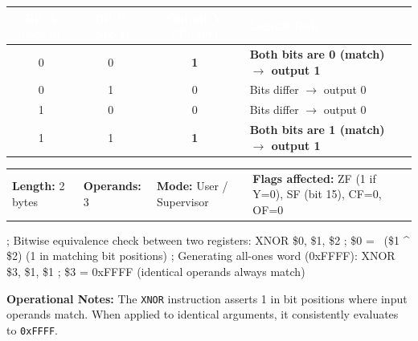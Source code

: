 \documentclass[11pt,a4paper]{article}
\newcommand{\reg}{\$}
\renewcommand{\arraystretch}{1.25}
\begin{document}
\vspace{0.5mm}
\par\vspace{0.8mm}
\noindent
{\footnotesize\renewcommand{\arraystretch}{1.1}%
\begin{tabularx}{\textwidth}{@{} c c c X @{}}
\toprule
\rowcolor{limslate}
\textcolor{white}{\textbf{Bit A (Src 0)}} & \textcolor{white}{\textbf{Bit B (Src 1)}} & \textcolor{white}{\textbf{Output Y (Target)}} & \textcolor{white}{\textbf{Logical Rule}} \\
\midrule
\rowcolor{limorangelight}
0 & 0 & \textbf{1} & \textbf{Both bits are 0 (match) $\rightarrow$ output 1} \\
\rowcolor{limroweven}
0 & 1 & 0 & Bits differ $\rightarrow$ output 0 \\
1 & 0 & 0 & Bits differ $\rightarrow$ output 0 \\
\rowcolor{limorangelight}
1 & 1 & \textbf{1} & \textbf{Both bits are 1 (match) $\rightarrow$ output 1} \\
\bottomrule
\end{tabularx}%
}
\vspace{1mm}

\begin{tcolorbox}[
    enhanced,
    colback=limcard,
    colframe=limborder,
    boxrule=0.6pt,
    arc=3pt,
    left=8pt,right=8pt,top=4pt,bottom=4pt
]
    \footnotesize
    \noindent
    \begin{tabularx}{\textwidth}{@{}l l l X@{}}
        \textbf{Length:} 2 bytes &
        \textbf{Operands:} 3 &
        \textbf{Mode:} User / Supervisor &
        \textbf{Flags affected:} ZF (1 if Y=0), SF (bit 15), CF=0, OF=0
    \end{tabularx}
\end{tcolorbox}

\begin{examplebox}[title={Usage Example (LIM2 Assembly)},top=4pt,bottom=4pt]
\begin{limasm}
; Bitwise equivalence check between two registers:
XNOR \reg0, \reg1, \reg2        ; \reg0 = ~(\reg1 ^ \reg2) (1 in matching bit positions)
; Generating all-ones word (0xFFFF):
XNOR \reg3, \reg1, \reg1        ; \reg3 = 0xFFFF (identical operands always match)
\end{limasm}
\vspace{1mm}
\footnotesize\color{limmuted}
\textbf{Operational Notes:} The \texttt{XNOR} instruction asserts 1 in bit positions where input operands match. When applied to identical arguments, it consistently evaluates to \texttt{0xFFFF}.
\end{examplebox}
\end{document}
